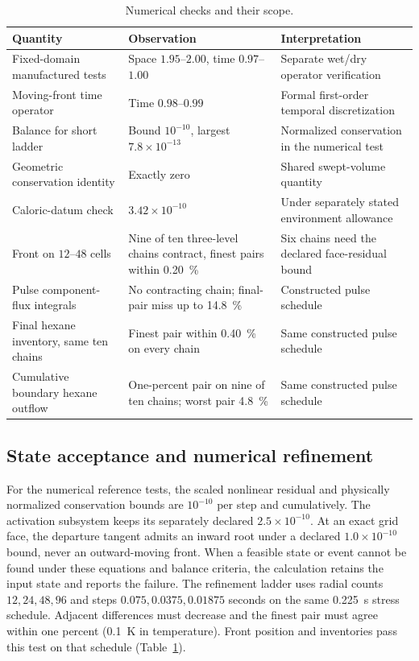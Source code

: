 \documentclass[11pt]{article}
\begin{document}
\begin{table}[htbp]\centering\footnotesize
\caption{Numerical checks and their scope.}\label{tab:sub:verification}
\begin{tabular}{@{}>{\raggedright\arraybackslash}p{}>{\raggedright\arraybackslash}p{}>{\raggedright\arraybackslash}p{}@{}}\toprule
Quantity & Observation & Interpretation\\\midrule
Fixed-domain manufactured tests & Space $1.95$--$2.00$, time $0.97$--$1.00$ & Separate wet/dry operator verification\\
Moving-front time operator & Time $0.98$--$0.99$ & Formal first-order temporal discretization\\
Balance for short ladder & Bound $10^{-10}$, largest $7.8\times10^{-13}$ & Normalized conservation in the numerical test\\
Geometric conservation identity & Exactly zero & Shared swept-volume quantity\\
Caloric-datum check & $3.42\times10^{-10}$ & Under separately stated environment allowance\\
Front on $12$--$48$ cells & Nine of ten three-level chains contract, finest pairs within \SI{0.20}{\percent} & Six chains need the declared face-residual bound\\
Pulse component-flux integrals & No contracting chain; final-pair miss up to \SI{14.8}{\percent} & Constructed pulse schedule\\
Final hexane inventory, same ten chains & Finest pair within \SI{0.40}{\percent} on every chain & Same constructed pulse schedule\\
Cumulative boundary hexane outflow & One-percent pair on nine of ten chains; worst pair \SI{4.8}{\percent} & Same constructed pulse schedule\\
\bottomrule\end{tabular}\end{table}

\subsection{State acceptance and numerical refinement}
\label{sup:moved:verification}\label{sup:moved:ladder}
For the numerical reference tests, the scaled nonlinear residual and physically normalized conservation bounds are $10^{-10}$ per step and cumulatively. The activation subsystem keeps its separately declared $2.5\times10^{-10}$. At an exact grid face, the departure tangent admits an inward root under a declared $1.0\times10^{-10}$ bound, never an outward-moving front. When a feasible state or event cannot be found under these equations and balance criteria, the calculation retains the input state and reports the failure. The refinement ladder uses radial counts $12,24,48,96$ and steps $0.075,0.0375,0.01875$ seconds on the same \SI{0.225}{\second} stress schedule. Adjacent differences must decrease and the finest pair must agree within one percent (\SI{0.1}{\kelvin} in temperature). Front position and inventories pass this test on that schedule (Table~\ref{tab:sub:verification}).
\end{document}
